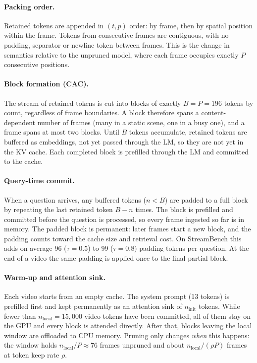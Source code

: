 \paragraph{Packing order.}
Retained tokens are appended in $(t,p)$ order: by frame, then by spatial position
within the frame. Tokens from consecutive frames are contiguous, with no padding,
separator or newline token between frames. This is the change in semantics relative to
the unpruned model, where each frame occupies exactly $P$ consecutive positions.

\paragraph{Block formation (CAC).}
The stream of retained tokens is cut into blocks of exactly $B{=}P{=}196$ tokens by
count, regardless of frame boundaries. A block therefore spans a content-dependent
number of frames (many in a static scene, one in a busy one), and a frame spans at most
two blocks. Until $B$ tokens accumulate, retained tokens are buffered as embeddings,
not yet passed through the LM, so they are not yet in the KV cache. Each completed
block is prefilled through the LM and committed to the cache.

\paragraph{Query-time commit.}
When a question arrives, any buffered tokens ($n<B$) are padded to a full block by
repeating the last retained token $B-n$ times. The block is prefilled and committed
before the question is processed, so every frame ingested so far is in memory. The
padded block is permanent: later frames start a new block, and the padding counts
toward the cache size and retrieval cost. On StreamBench this adds on average 96
($\tau{=}0.5$) to 99 ($\tau{=}0.8$) padding tokens per question. At the end of a video
the same padding is applied once to the final partial block.

\paragraph{Warm-up and attention sink.}
Each video starts from an empty cache. The system prompt (13 tokens) is prefilled first
and kept permanently as an attention sink of $n_{\text{init}}$ tokens. While fewer than
$n_{\text{local}}{=}15{,}000$ video tokens have been committed, all of them stay on the
GPU and every block is attended directly. After that, blocks leaving the local window
are offloaded to CPU memory. Pruning only changes \emph{when} this happens: the window
holds $n_{\text{local}}/P\approx 76$ frames unpruned and about
$n_{\text{local}}/(\rho P)$ frames at token keep rate $\rho$.

